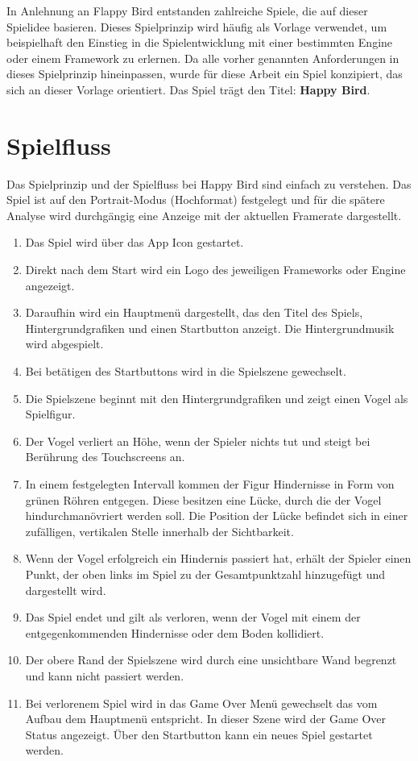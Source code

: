 \bigskip
In Anlehnung an Flappy Bird entstanden zahlreiche Spiele, die auf dieser Spielidee basieren. Dieses Spielprinzip wird häufig als Vorlage verwendet, um beispielhaft den Einstieg in die Spielentwicklung mit einer bestimmten Engine oder einem Framework zu erlernen. Da alle vorher genannten Anforderungen in dieses Spielprinzip hineinpassen, wurde für diese Arbeit ein Spiel konzipiert, das sich an dieser Vorlage orientiert. Das Spiel trägt den Titel: \textbf{Happy Bird}. 

\section{Spielfluss}
Das Spielprinzip und der Spielfluss bei Happy Bird sind einfach zu verstehen. Das Spiel ist auf den Portrait-Modus (Hochformat) festgelegt und für die spätere Analyse wird durchgängig eine Anzeige mit der aktuellen Framerate dargestellt.


\begin{enumerate}
	\item Das Spiel wird über das App Icon gestartet.
	\item Direkt nach dem Start wird ein Logo des jeweiligen Frameworks oder Engine angezeigt.
	\item Daraufhin wird ein Hauptmenü dargestellt, das den Titel des Spiels, Hintergrundgrafiken und einen Startbutton anzeigt. Die Hintergrundmusik wird abgespielt.
	\item Bei betätigen des Startbuttons wird in die Spielszene gewechselt.
	\item Die Spielszene beginnt mit den Hintergrundgrafiken und zeigt einen Vogel als Spielfigur.
	\item Der Vogel verliert an Höhe, wenn der Spieler nichts tut und steigt bei Berührung des Touchscreens an.
	\item In einem festgelegten Intervall kommen der Figur Hindernisse in Form von grünen Röhren entgegen. Diese besitzen eine Lücke, durch die der Vogel hindurchmanövriert werden soll. Die Position der Lücke befindet sich in einer zufälligen, vertikalen Stelle innerhalb der Sichtbarkeit.
	\item Wenn der Vogel erfolgreich ein Hindernis passiert hat, erhält der Spieler einen Punkt, der oben links im Spiel zu der Gesamtpunktzahl hinzugefügt und dargestellt wird.
	\item Das Spiel endet und gilt als verloren, wenn der Vogel mit einem der entgegenkommenden Hindernisse oder dem Boden kollidiert.
	\item Der obere Rand der Spielszene wird durch eine unsichtbare Wand begrenzt und kann nicht passiert werden.
	\item Bei verlorenem Spiel wird in das Game Over Menü gewechselt das vom Aufbau dem Hauptmenü entspricht. In dieser Szene wird der Game Over Status angezeigt. Über den Startbutton kann ein neues Spiel gestartet werden.
\end{enumerate}


